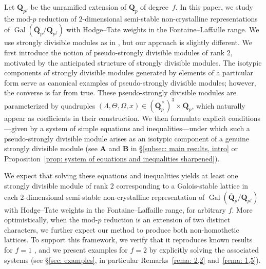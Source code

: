 \documentclass[11pt]{amsart}
\theoremstyle{definition}
\numberwithin{equation}{subsection}
\theoremstyle{plain}
\theoremstyle{plain}
\theoremstyle{plain}
\theoremstyle{plain}
\theoremstyle{plain}
\theoremstyle{plain}
\theoremstyle{plain}
\theoremstyle{plain}
\theoremstyle{plain}
\theoremstyle{plain}
\theoremstyle{plain}
\theoremstyle{plain}
\theoremstyle{definition}
\theoremstyle{definition}
\theoremstyle{definition}
\theoremstyle{remark}
\renewcommand{\(}{\textup{(}}
\renewcommand{\)}{\textup{)}}
\DeclareMathOperator{\Gal}{Gal}
\newcommand{\Q}{\mathbf{Q}}
\begin{document}
Let $\Q_{p^f}$ be the unramified extension of $\Q_p$ of degree~$f$. In this paper, we study the mod-$p$ reduction of $2$-dimensional semi-stable non-crystalline representations of $\Gal(\overline{\Q}_p/\Q_{p^f})$ with Hodge–Tate weights in the Fontaine–Laffaille range. We use strongly divisible modules as in \cite{BM}, but our approach is slightly different. We first introduce the notion of pseudo-strongly divisible modules of rank $2$, motivated by the anticipated structure of strongly divisible modules. The isotypic components of strongly divisible modules generated by elements of a particular form serve as canonical examples of pseudo-strongly divisible modules; however, the converse is far from true. These pseudo-strongly divisible modules are parameterized by quadruples $(\Lambda, \Theta, \Omega, x) \in (\overline{\Q}_p^\times)^3 \times \overline{\Q}_p$, which naturally appear as coefficients in their construction. We then formulate explicit conditions—given by a system of simple equations and inequalities—under which such a pseudo-strongly divisible module arises as an isotypic component of a genuine strongly divisible module (see \textbf{A} and \textbf{B} in \S\ref{subsec: main results, intro} or Proposition~\ref{prop: system of equations and inequalities sharpened}).

We expect that solving these equations and inequalities yields at least one strongly divisible module of rank $2$ corresponding to a Galois-stable lattice in each $2$-dimensional semi-stable non-crystalline representation of $\Gal(\overline{\Q}_p/\Q_{p^f})$ with Hodge–Tate weights in the Fontaine–Laffaille range, for arbitrary $f$. More optimistically, when the mod-$p$ reduction is an extension of two distinct characters, we further expect our method to produce both non-homothetic lattices. To support this framework, we verify that it reproduces known results for $f = 1$ \cite{BM, GP, LP}, and we present examples for $f = 2$ by explicitly solving the associated systems (see \S\ref{sec: examples}, in particular Remarks~\ref{rema: 2,2} and~\ref{rema: 1,5}).
\end{document}
